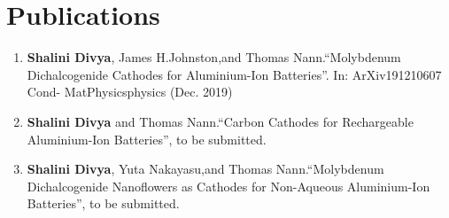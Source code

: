 \section*{\centering Publications}
\begin{enumerate}
    \item \textbf{Shalini Divya}, James H.Johnston,and Thomas Nann.“Molybdenum Dichalcogenide Cathodes for Aluminium-Ion Batteries”. In: ArXiv191210607 Cond- MatPhysicsphysics (Dec. 2019) %
    \item \textbf{Shalini Divya} and Thomas Nann.“Carbon Cathodes for Rechargeable Aluminium-Ion Batteries”, to be submitted.
    \item \textbf{Shalini Divya}, Yuta Nakayasu,and Thomas Nann.“Molybdenum Dichalcogenide Nanoflowers as Cathodes for Non-Aqueous Aluminium-Ion Batteries”, to be submitted.
\end{enumerate}

